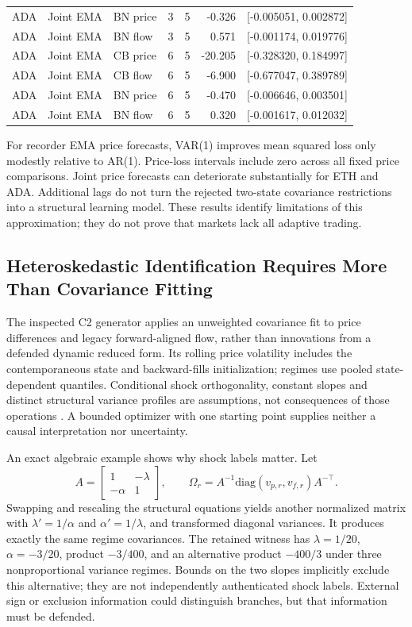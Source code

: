 {\begin{longtable}{lllrrrl}
ADA & Joint EMA & BN price & 3 & 5 & -0.326 & [-0.005051, 0.002872]\\
ADA & Joint EMA & BN flow & 3 & 5 & 0.571 & [-0.001174, 0.019776]\\
ADA & Joint EMA & CB price & 6 & 5 & -20.205 & [-0.328320, 0.184997]\\
ADA & Joint EMA & CB flow & 6 & 5 & -6.900 & [-0.677047, 0.389789]\\
ADA & Joint EMA & BN price & 6 & 5 & -0.470 & [-0.006646, 0.003501]\\
ADA & Joint EMA & BN flow & 6 & 5 & 0.320 & [-0.001617, 0.012032]\\
\end{longtable}
}

For recorder EMA price forecasts, VAR(1) improves mean squared loss only modestly relative to AR(1). Price-loss intervals include zero across all fixed price comparisons. Joint price forecasts can deteriorate substantially for ETH and ADA. Additional lags do not turn the rejected two-state covariance restrictions into a structural learning model. These results identify limitations of this approximation; they do not prove that markets lack all adaptive trading.

\subsection{Heteroskedastic Identification Requires More Than Covariance Fitting}
The inspected C2 generator applies an unweighted covariance fit to price differences and legacy forward-aligned flow, rather than innovations from a defended dynamic reduced form. Its rolling price volatility includes the contemporaneous state and backward-fills initialization; regimes use pooled state-dependent quantiles. Conditional shock orthogonality, constant slopes and distinct structural variance profiles are assumptions, not consequences of those operations \citep{rigobon2003identification}. A bounded optimizer with one starting point supplies neither a causal interpretation nor uncertainty.

An exact algebraic example shows why shock labels matter. Let
\[
A=\begin{bmatrix}1&-\lambda\\-\alpha&1\end{bmatrix},\qquad
\Omega_r=A^{-1}\mathrm{diag}(v_{p,r},v_{f,r})A^{-\top}.
\]
Swapping and rescaling the structural equations yields another normalized matrix with $\lambda'=1/\alpha$ and $\alpha'=1/\lambda$, and transformed diagonal variances. It produces exactly the same regime covariances. The retained witness has $\lambda=1/20$, $\alpha=-3/20$, product $-3/400$, and an alternative product $-400/3$ under three nonproportional variance regimes. Bounds on the two slopes implicitly exclude this alternative; they are not independently authenticated shock labels. External sign or exclusion information could distinguish branches, but that information must be defended.

